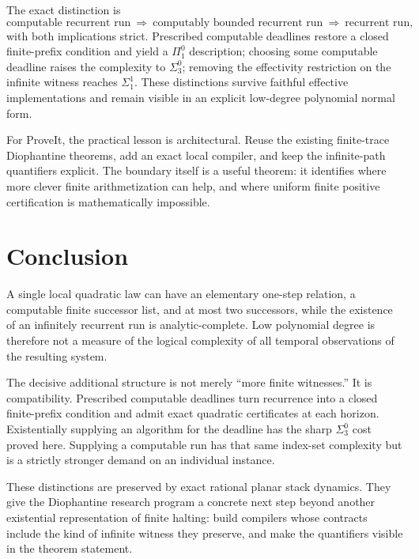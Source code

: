 \documentclass[11pt,letterpaper]{article}
\theoremstyle{definition}
\theoremstyle{remark}
\newcommand{\1}{\mathbf 1}
\newcommand{\srctag}[1]{\texorpdfstring{\hspace{0.4em}{\normalfont\small\color{accent}[source #1]}}{ [source #1]}}
\begin{document}
The exact distinction is
\[
 \text{computable recurrent run}
 \ \Longrightarrow\
 \text{computably bounded recurrent run}
 \ \Longrightarrow\
 \text{recurrent run},
\]
with both implications strict. Prescribed computable deadlines restore a
closed finite-prefix condition and yield a $\Pi^0_1$ description; choosing
some computable deadline raises the complexity to $\Sigma^0_3$; removing the
effectivity restriction on the infinite witness reaches $\Sigma^1_1$.
These distinctions survive faithful effective implementations and remain
visible in an explicit low-degree polynomial normal form.

For ProveIt, the practical lesson is architectural. Reuse the existing
finite-trace Diophantine theorems, add an exact local compiler, and keep the
infinite-path quantifiers explicit. The boundary itself is a useful theorem:
it identifies where more clever finite arithmetization can help, and where
uniform finite positive certification is mathematically impossible.
\section{Conclusion\srctag{11}}
A single local quadratic law can have an elementary one-step relation,
a computable finite successor list, and at most two successors, while the
existence of an infinitely recurrent run is analytic-complete. Low polynomial
degree is therefore not a measure of the logical complexity of all temporal
observations of the resulting system.

The decisive additional structure is not merely ``more finite witnesses.''
It is compatibility. Prescribed computable deadlines turn recurrence into a
closed finite-prefix condition and admit exact quadratic certificates at each
horizon. Existentially supplying an algorithm for the deadline has the sharp
$\Sigma^0_3$ cost proved here. Supplying a computable run has that same index-set
complexity but is a strictly stronger demand on an individual instance.

These distinctions are preserved by exact rational planar stack dynamics.
They give the Diophantine research program a concrete next step beyond another
existential representation of finite halting: build compilers whose contracts
include the kind of infinite witness they preserve, and make the quantifiers
visible in the theorem statement.
\end{document}

